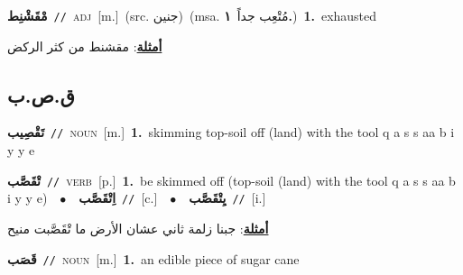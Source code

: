 \documentclass[10pt,a4paper,twoside]{article} %
\begin{document}
\begin{multicols}{2}
{\setlength\topsep{0pt}\textbf{\foreignlanguage{arabic}{مْقَشْنِط}}\ {\color{gray}\texttt{//}\color{black}}\ \textsc{adj}\ [m.]\ (src. \color{gray}\foreignlanguage{arabic}{جنين}\color{black})\ \color{gray}(msa. \foreignlanguage{arabic}{مُتْعِب جداً}~\foreignlanguage{arabic}{\textbf{١.}})\color{black}\ \textbf{1.}~exhausted\  \begin{flushright}\color{gray}\foreignlanguage{arabic}{\textbf{\underline{\foreignlanguage{arabic}{أمثلة}}}: مقشنط من كثر الركض}\end{flushright}\color{black}} \vspace{2mm}

\vspace{-3mm}
\subsection*{\color{blue}\foreignlanguage{arabic}{ق.ص.ب}\color{blue}{}} 

{\setlength\topsep{0pt}\textbf{\foreignlanguage{arabic}{تَقْصِيب}}\ {\color{gray}\texttt{//}\color{black}}\ \textsc{noun}\ [m.]\ \textbf{1.}~skimming top-soil off (land) with the tool q a s s aa b i y y e\ } \vspace{2mm}

{\setlength\topsep{0pt}\textbf{\foreignlanguage{arabic}{تْقَصَّب}}\ {\color{gray}\texttt{//}\color{black}}\ \textsc{verb}\ [p.]\ \textbf{1.}~be skimmed off (top-soil (land) with the tool q a s s aa b i y y e)\ \ $\bullet$\ \ \setlength\topsep{0pt}\textbf{\foreignlanguage{arabic}{اِتْقَصَّب}}\ {\color{gray}\texttt{//}\color{black}}\ [c.]\ \ $\bullet$\ \ \setlength\topsep{0pt}\textbf{\foreignlanguage{arabic}{يِتْقَصَّب}}\ {\color{gray}\texttt{//}\color{black}}\ [i.]\  \begin{flushright}\color{gray}\foreignlanguage{arabic}{\textbf{\underline{\foreignlanguage{arabic}{أمثلة}}}: جبنا زلمة ثاني عشان الأرض ما تْقَصَّبت منيح}\end{flushright}\color{black}} \vspace{2mm}

{\setlength\topsep{0pt}\textbf{\foreignlanguage{arabic}{قَصَب}}\ {\color{gray}\texttt{//}\color{black}}\ \textsc{noun}\ [m.]\ \textbf{1.}~an edible piece of sugar cane\ } \vspace{2mm}


\end{multicols}
\end{document}
